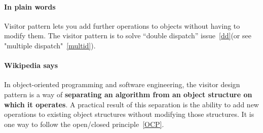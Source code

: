 \documentclass{book}
\begin{document}
\paragraph{In plain words}
    Visitor pattern lets you add further operations to objects without having to modify them.
The visitor pattern is to solve ``double dispatch'' issue~\ref{dd}(or see "multiple dispatch"~\ref{multid}).
\paragraph{Wikipedia says}
  In object-oriented programming and software engineering, the visitor design pattern is a way of \textbf{separating an algorithm from an object structure on which it operates}. 
  A practical result of this separation is the ability to add new operations to existing object structures without modifying those structures. 
  It is one way to follow the open/closed principle~\ref{OCP}.

\end{document}
